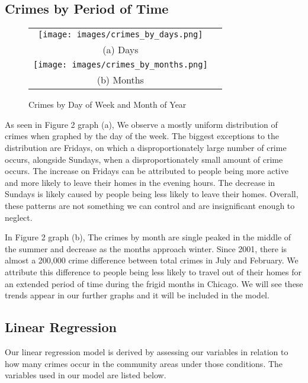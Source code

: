 \documentclass{article}
\begin{document}
\begin{onehalfspacing}
\subsection{Crimes by Period of Time}
\begin{figure}[H]
\centering
\begin{tabular}{cc}
  \centerline{\texttt{[image: images/crimes\_by\_days.png]}} \\ 
  (a) Days \\[6pt]
  \centerline{\texttt{[image: images/crimes\_by\_months.png]}} \\
  (b) Months \\[6pt]
\end{tabular}
\caption{Crimes by Day of Week and Month of Year}
\end{figure}
As seen in Figure 2 graph (a), We observe a mostly uniform distribution of crimes when graphed by the day of the week. The biggest exceptions to the distribution are Fridays, on which a disproportionately large number of crime occurs, alongside Sundays, when a disproportionately small amount of crime occurs. The increase on Fridays can be attributed to people being more active and more likely to leave their homes in the evening hours. The decrease in Sundays is likely caused by people being less likely to leave their homes. Overall, these patterns are not something we can control and are insignificant enough to neglect. 

In Figure 2 graph (b), The crimes by month are single peaked in the middle of the summer and decrease as the months approach winter. Since 2001, there is almost a 200,000 crime difference between total crimes in July and February. We attribute this difference to people being less likely to travel out of their homes for an extended period of time during the frigid months in Chicago. We will see these trends appear in our further graphs and it will be included in the model.

\subsection{Linear Regression}
Our linear regression model is derived by assessing our variables in relation to how many crimes occur in the community areas under those conditions. The variables used in our model are listed below.


\end{onehalfspacing}
\end{document}
